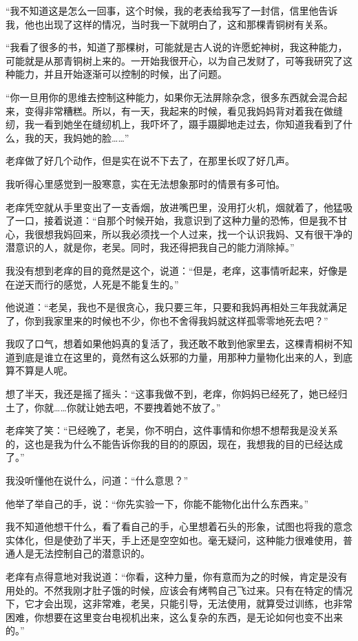 “我不知道这是怎么一回事，这个时候，我的老表给我写了一封信，信里他告诉我，他也出现了这样的情况，当时我一下就明白了，这和那棵青铜树有关系。

“我看了很多的书，知道了那棵树，可能就是古人说的许愿蛇神树，我这种能力，可能就是从那青铜树上来的。一开始我很开心，以为自己发财了，可等我研究了这种能力，并且开始逐渐可以控制的时候，出了问题。

“你一旦用你的思维去控制这种能力，如果你无法屏除杂念，很多东西就会混合起来，变得非常糟糕。所以，有一天，我起来的时候，看见我妈妈背对着我在做缝纫，我一看到她坐在缝纫机上，我吓坏了，蹑手蹑脚地走过去，你知道我看到了什么，我的天，我妈她的脸……”

老痒做了好几个动作，但是实在说不下去了，在那里长叹了好几声。

我听得心里感觉到一股寒意，实在无法想象那时的情景有多可怕。

老痒凭空就从手里变出了一支香烟，放进嘴巴里，没用打火机，烟就着了，他猛吸了一口，接着说道：“自那个时候开始，我意识到了这种力量的恐怖，但是我不甘心，我很想我妈回来，所以我必须找一个人过来，找一个认识我妈、又有很干净的潜意识的人，就是你，老吴。同时，我还得把我自己的能力消除掉。”

我没有想到老痒的目的竟然是这个，说道：“但是，老痒，这事情听起来，好像是在逆天而行的感觉，人死是不能复生的。”

他说道：“老吴，我也不是很贪心，我只要三年，只要和我妈再相处三年我就满足了，你到我家里来的时候也不少，你也不舍得我妈就这样孤零零地死去吧？”

我叹了口气，想着如果他妈真的复活了，我还敢不敢到他家里去，这棵青桐树不知道到底是谁立在这里的，竟然有这么妖邪的力量，用那种力量物化出来的人，到底算不算是人呢。

想了半天，我还是摇了摇头：“这事我做不到，老痒，你妈妈已经死了，她已经归土了，你就……你就让她去吧，不要拽着她不放了。”

老痒笑了笑：“已经晚了，老吴，你不明白，这件事情和你想不想帮我是没关系的，这也是我为什么不能告诉你我的目的的原因，现在，我想我的目的已经达成了。”

我没听懂他在说什么，问道：“什么意思？”

他举了举自己的手，说：“你先实验一下，你能不能物化出什么东西来。”

我不知道他想干什么，看了看自己的手，心里想着石头的形象，试图也将我的意念实体化，但是使劲了半天，手上还是空空如也。毫无疑问，这种能力很难使用，普通人是无法控制自己的潜意识的。

老痒有点得意地对我说道：“你看，这种力量，你有意而为之的时候，肯定是没有用处的。不然我刚才肚子饿的时候，应该会有烤鸭自己飞过来。只有在特定的情况下，它才会出现，这非常难，老吴，只能引导，无法使用，就算受过训练，也非常困难，你想要在这里变台电视机出来，这么复杂的东西，是无论如何也变不出来的。”

